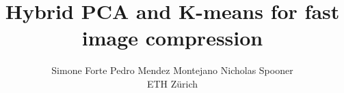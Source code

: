 \documentclass[10pt,conference,compsocconf]{IEEEtran}
\title{Hybrid PCA and K-means for fast image compression}
\author{Simone Forte \qquad Pedro Mendez Montejano \qquad Nicholas Spooner \\
		ETH Z\"urich}
\begin{document}
\maketitle

\begin{abstract}
\end{abstract}












\end{document}
